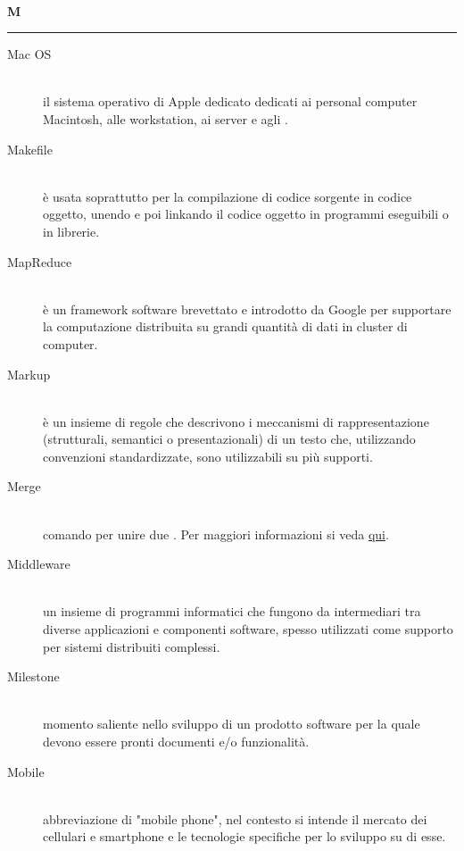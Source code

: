 \documentclass[12pt,a4paper]{article}
\begin{document}
\newpage

\begin{center}
\hfill\\
	\LARGE \textbf{M}
\hfill\\
\rule[15pt]{30pt}{0.5pt}
\end{center}

\begin{description}
\item[Mac OS] 
\hfill\\ il sistema operativo di Apple dedicato dedicati ai personal computer Macintosh, alle workstation, ai server e agli .

\item[Makefile] 
\hfill\\ è usata soprattutto per la compilazione di codice sorgente in codice oggetto, unendo e poi linkando il codice oggetto in programmi eseguibili o in librerie.

\item[MapReduce] 
\hfill\\ è un framework software brevettato e introdotto da Google per supportare la computazione distribuita su grandi quantità di dati in cluster di computer.

\item[Markup] 
\hfill\\ è un insieme di regole che descrivono i meccanismi di rappresentazione (strutturali, semantici o presentazionali) di un testo che, utilizzando convenzioni standardizzate, sono utilizzabili su più supporti.

\item[Merge] 
\hfill\\ comando  per unire due . Per maggiori informazioni si veda \href{https://git-scm.com/docs/}{qui}.

\item[Middleware] 
\hfill\\ un insieme di programmi informatici che fungono da intermediari tra diverse applicazioni e componenti software,  spesso utilizzati come supporto per sistemi distribuiti complessi.


\item[Milestone] 
\hfill\\ momento saliente nello sviluppo di un prodotto software per la quale devono essere pronti documenti e/o funzionalità.

\item[Mobile] 
\hfill\\ abbreviazione di "mobile phone", nel contesto si intende il mercato dei cellulari e smartphone e le tecnologie specifiche per lo sviluppo su di esse.


\end{description}
\end{document}
